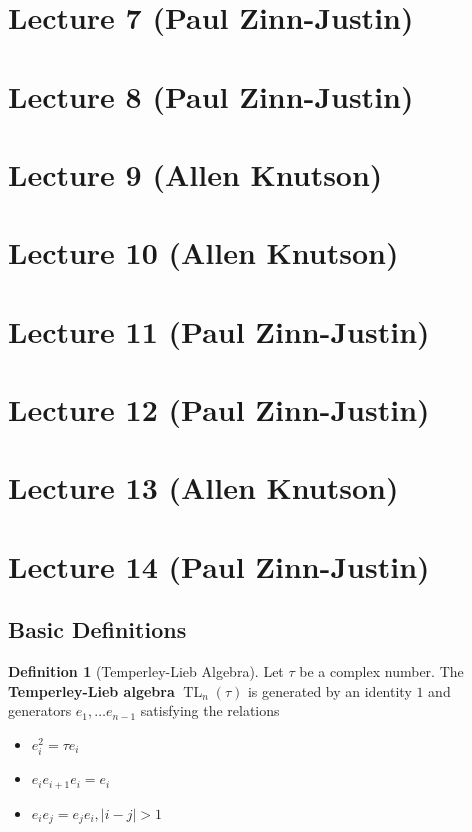 \documentclass[12pt]{amsart}
\numberwithin{equation}{section}
\theoremstyle{definition}
\newtheorem{Definition}[equation]{Definition}
\numberwithin{figure}{section}
\newcommand{\on}[1]{\operatorname{#1}}
\newcommand{\TeL}{\on{TL}}
\begin{document}
\section{Lecture 7 (Paul Zinn-Justin)}

\section{Lecture 8 (Paul Zinn-Justin)}

\section{Lecture 9 (Allen Knutson)}

\section{Lecture 10 (Allen Knutson)}

\section{Lecture 11 (Paul Zinn-Justin)}

\section{Lecture 12 (Paul Zinn-Justin)}

\section{Lecture 13 (Allen Knutson)}

\section{Lecture 14 (Paul Zinn-Justin)}

\subsection{Basic Definitions}

\begin{Definition}[Temperley-Lieb Algebra]
	Let $\tau$ be a complex number. The \textbf{Temperley-Lieb algebra} $\TeL_n(\tau)$ is generated by an identity $1$ and generators $e_1, \ldots e_{n-1}$ satisfying the relations
	\begin{itemize}
		\item $e_i^2 = \tau e_i$
		\item $e_i e_{i+1} e_i = e_i$
		\item $e_i e_j = e_j e_i, |i-j|>1$
	\end{itemize}
\end{Definition}
\end{document}
